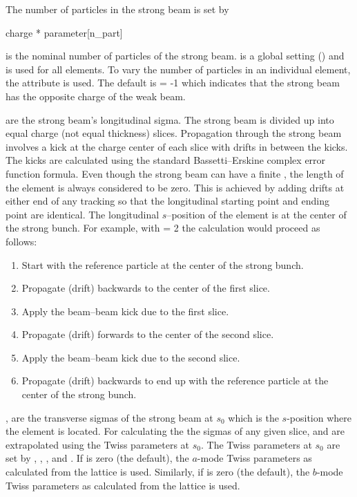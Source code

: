 The number of particles in the strong beam is set by
\begin{example}
  charge * parameter[n_part]
\end{example}
 is the nominal number of particles of the strong
beam.  is a global setting () and is 
used for all  elements. 
To vary the number of particles in an individual  element,
the  attribute is used.
The default is  = -1 which indicates
that the strong beam has the opposite charge of the weak beam.

 are the strong beam's longitudinal sigma.
The strong beam is divided up into  equal charge (not
equal thickness) slices. Propagation through the strong beam involves
a kick at the charge center of each slice with drifts in between the
kicks. The kicks are calculated using the standard Bassetti--Erskine
complex error function formula\cite{b:talman}.  Even though the strong
beam can have a finite , the length of the element is always
considered to be zero. This is achieved by adding drifts at either end
of any tracking so that the longitudinal starting point and ending
point are identical. The longitudinal $s$--position of the
 element is at the center of the strong bunch. For
example, with  = 2 the calculation would proceed as
follows:
\begin{enumerate}
  \item  Start with the reference particle at the center of the strong bunch.
  \item  Propagate (drift) backwards to the center of the first slice.
  \item  Apply the beam--beam kick due to the first slice.
  \item  Propagate (drift) forwards to the center of the second slice.
  \item  Apply the beam--beam kick due to the second slice.
  \item  Propagate (drift) backwards to end up with the reference particle
     at the center of the strong bunch.
\end{enumerate}

,  are the transverse sigmas of the strong beam
at $s_0$ which is the $s$-position where the  element is located. 
For calculating the the sigmas of any given slice,  and  
are extrapolated using the Twiss parameters at $s_0$. The Twiss parameters
at $s_0$ are set by , , , and .
If  is zero (the default), the $a$-mode Twiss parameters as 
calculated from the lattice is used. Similarly, 
if  is zero (the default), the $b$-mode Twiss parameters as 
calculated from the lattice is used.


